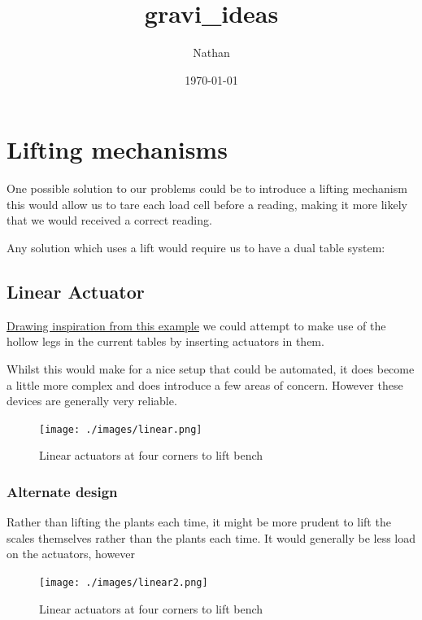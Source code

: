 \documentclass[11pt]{article}
\author{Nathan}
\date{\today}
\title{gravi\_ideas}
\begin{document}
\maketitle
\tableofcontents

\clearpage 

\section{Lifting mechanisms}
\label{sec-1}

One possible solution to our problems could be to introduce a lifting mechanism this would allow us to tare each load cell before a reading, making it 
more likely that we would received a correct reading. 

Any solution which uses a lift would require us to have a dual table system: 


\subsection{Linear Actuator}
\label{sec-1-1}

\href{http://www.instructables.com/id/Electric-Height-Adjustable-Desk/?ALLSTEPS}{Drawing inspiration from this example} we could attempt to make use of the hollow legs in the current
tables by inserting actuators in them. 

Whilst this would make for a nice setup that could be automated, it does become a little more complex 
and does introduce a few areas of concern. However these devices are generally very reliable. 
\begin{figure}[htb]
\centering
\texttt{[image: ./images/linear.png]}
\caption{\label{fig:Linear-Actuator}Linear actuators at four corners to lift bench}
\end{figure}

\subsubsection{Alternate design}
\label{sec-1-1-1}

Rather than lifting the plants each time, it might be more prudent to lift the scales themselves rather than the 
plants each time. It would generally be less load on the actuators, however 
\begin{figure}[htb]
\centering
\texttt{[image: ./images/linear2.png]}
\caption{\label{fig:Linear-Actuator}Linear actuators at four corners to lift bench}
\end{figure}
\end{document}
